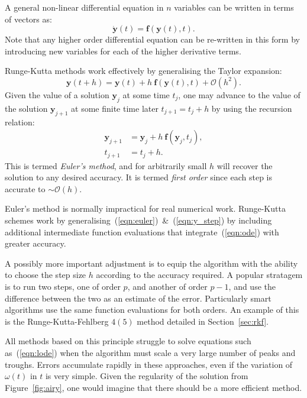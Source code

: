 A general non-linear differential equation in $n$ variables can be written in terms of vectors as:
\begin{equation}
  \dot{\mathbf{y}}(t) = \mathbf{f}(\mathbf{y}(t),t).
  \label{eqn:ode}
\end{equation}
Note that any higher order differential equation can be re-written in this form by introducing new variables for each of the higher derivative terms.

Runge-Kutta methods work effectively by generalising the Taylor expansion:
\begin{equation}
  \mathbf{y}(t+h)  = \mathbf{y}(t) + h\:\mathbf{f}(\mathbf{y}(t),t) + \mathcal{O}(h^2).
  \label{eqn:euler}
\end{equation}
Given the value of a solution $\mathbf{y}_j$ at some time $t_j$, one may advance to the value of the solution $\mathbf{y}_{j+1}$ at some finite time later $t_{j+1} = t_j + h$ by using the recursion relation:
\begin{align}
  \mathbf{y}_{j+1} &=  \mathbf{y}_{j} + h\:\mathbf{f}(\mathbf{y}_j,t_j),
  \label{eqn:y_step}\\
  t_{j+1} &=  t_{j} + h.
  \label{eqn:t_step}
\end{align}
This is termed {\em Euler's method}, and for arbitrarily small $h$ will recover the solution to any desired accuracy. It is termed {\em first order\/} since each step is accurate to $\sim \mathcal{O}(h)$.

Euler's method is normally impractical for real numerical work. Runge-Kutta schemes work by generalising~(\ref{eqn:euler})~\&~(\ref{eqn:y_step}) by including additional intermediate function evaluations that integrate~(\ref{eqn:ode}) with greater accuracy.

A possibly more important adjustment is to equip the algorithm with the ability to choose the step size $h$ according to the accuracy required. A popular stratagem is to run two steps, one of order $p$, and another of order $p-1$, and use the difference between the two as an estimate of the error. Particularly smart algorithms use the same function evaluations for both orders. An example of this is the Runge-Kutta-Fehlberg $4(5)$ method detailed in Section~\ref{sec:rkf}.

All methods based on this principle struggle to solve equations such as~(\ref{eqn:lode}) when the algorithm must scale a very large number of peaks and troughs. Errors accumulate rapidly in these approaches, even if the variation of $\omega(t)$ in $t$ is very simple. Given the regularity of the solution from Figure~\ref{fig:airy}, one would imagine that there should be a more efficient method.



